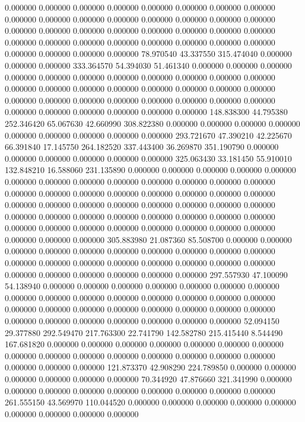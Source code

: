 0.000000 0.000000 0.000000
0.000000 0.000000 0.000000
0.000000 0.000000 0.000000
0.000000 0.000000 0.000000
0.000000 0.000000 0.000000
0.000000 0.000000 0.000000
0.000000 0.000000 0.000000
0.000000 0.000000 0.000000
0.000000 0.000000 0.000000
0.000000 0.000000 0.000000
0.000000 0.000000 0.000000
0.000000 0.000000 0.000000
78.970540 43.337550 315.474040
0.000000 0.000000 0.000000
333.364570 54.394030 51.461340
0.000000 0.000000 0.000000
0.000000 0.000000 0.000000
0.000000 0.000000 0.000000
0.000000 0.000000 0.000000
0.000000 0.000000 0.000000
0.000000 0.000000 0.000000
0.000000 0.000000 0.000000
0.000000 0.000000 0.000000
0.000000 0.000000 0.000000
0.000000 0.000000 0.000000
0.000000 0.000000 0.000000
148.838300 44.795380 252.346420
65.067630 42.660990 308.822380
0.000000 0.000000 0.000000
0.000000 0.000000 0.000000
0.000000 0.000000 0.000000
293.721670 47.390210 42.225670
66.391840 17.145750 264.182520
337.443400 36.269870 351.190790
0.000000 0.000000 0.000000
0.000000 0.000000 0.000000
325.063430 33.181450 55.910010
132.848210 16.588060 231.135890
0.000000 0.000000 0.000000
0.000000 0.000000 0.000000
0.000000 0.000000 0.000000
0.000000 0.000000 0.000000
0.000000 0.000000 0.000000
0.000000 0.000000 0.000000
0.000000 0.000000 0.000000
0.000000 0.000000 0.000000
0.000000 0.000000 0.000000
0.000000 0.000000 0.000000
0.000000 0.000000 0.000000
0.000000 0.000000 0.000000
0.000000 0.000000 0.000000
0.000000 0.000000 0.000000
0.000000 0.000000 0.000000
0.000000 0.000000 0.000000
305.883980 21.087360 85.508700
0.000000 0.000000 0.000000
0.000000 0.000000 0.000000
0.000000 0.000000 0.000000
0.000000 0.000000 0.000000
0.000000 0.000000 0.000000
0.000000 0.000000 0.000000
0.000000 0.000000 0.000000
0.000000 0.000000 0.000000
297.557930 47.100090 54.138940
0.000000 0.000000 0.000000
0.000000 0.000000 0.000000
0.000000 0.000000 0.000000
0.000000 0.000000 0.000000
0.000000 0.000000 0.000000
0.000000 0.000000 0.000000
0.000000 0.000000 0.000000
0.000000 0.000000 0.000000
0.000000 0.000000 0.000000
0.000000 0.000000 0.000000
52.094150 29.377880 292.549470
217.763300 22.741790 142.582780
215.415440 8.544490 167.681820
0.000000 0.000000 0.000000
0.000000 0.000000 0.000000
0.000000 0.000000 0.000000
0.000000 0.000000 0.000000
0.000000 0.000000 0.000000
0.000000 0.000000 0.000000
121.873370 42.908290 224.789850
0.000000 0.000000 0.000000
0.000000 0.000000 0.000000
70.344920 47.876660 321.341990
0.000000 0.000000 0.000000
0.000000 0.000000 0.000000
0.000000 0.000000 0.000000
261.555150 43.569970 110.044520
0.000000 0.000000 0.000000
0.000000 0.000000 0.000000
0.000000 0.000000 0.000000
